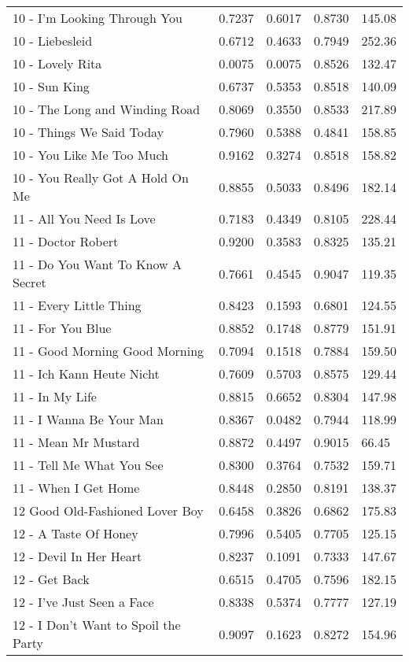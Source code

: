 \begin{longtable}[c]{|p{8cm}|c|l|l|l|}
10 - I'm Looking Through You & 0.7237 & 0.6017 & 0.8730 & 145.08 \\
10 - Liebesleid & 0.6712 & 0.4633 & 0.7949 & 252.36 \\
10 - Lovely Rita & 0.0075 & 0.0075 & 0.8526 & 132.47 \\
10 - Sun King & 0.6737 & 0.5353 & 0.8518 & 140.09 \\
10 - The Long and Winding Road & 0.8069 & 0.3550 & 0.8533 & 217.89 \\
10 - Things We Said Today & 0.7960 & 0.5388 & 0.4841 & 158.85 \\
10 - You Like Me Too Much & 0.9162 & 0.3274 & 0.8518 & 158.82 \\
10 - You Really Got A Hold On Me & 0.8855 & 0.5033 & 0.8496 & 182.14 \\
11 - All You Need Is Love & 0.7183 & 0.4349 & 0.8105 & 228.44 \\
11 - Doctor Robert & 0.9200 & 0.3583 & 0.8325 & 135.21 \\
11 - Do You Want To Know A Secret & 0.7661 & 0.4545 & 0.9047 & 119.35 \\
11 - Every Little Thing & 0.8423 & 0.1593 & 0.6801 & 124.55 \\
11 - For You Blue & 0.8852 & 0.1748 & 0.8779 & 151.91 \\
11 - Good Morning Good Morning & 0.7094 & 0.1518 & 0.7884 & 159.50 \\
11 - Ich Kann Heute Nicht & 0.7609 & 0.5703 & 0.8575 & 129.44 \\
11 - In My Life & 0.8815 & 0.6652 & 0.8304 & 147.98 \\
11 - I Wanna Be Your Man & 0.8367 & 0.0482 & 0.7944 & 118.99 \\
11 - Mean Mr Mustard & 0.8872 & 0.4497 & 0.9015 & 66.45 \\
11 - Tell Me What You See & 0.8300 & 0.3764 & 0.7532 & 159.71 \\
11 - When I Get Home & 0.8448 & 0.2850 & 0.8191 & 138.37 \\
12 Good Old-Fashioned Lover Boy & 0.6458 & 0.3826 & 0.6862 & 175.83 \\
12 - A Taste Of Honey & 0.7996 & 0.5405 & 0.7705 & 125.15 \\
12 - Devil In Her Heart & 0.8237 & 0.1091 & 0.7333 & 147.67 \\
12 - Get Back & 0.6515 & 0.4705 & 0.7596 & 182.15 \\
12 - I've Just Seen a Face & 0.8338 & 0.5374 & 0.7777 & 127.19 \\
12 - I Don't Want to Spoil the Party & 0.9097 & 0.1623 & 0.8272 & 154.96 \\

\end{longtable}
